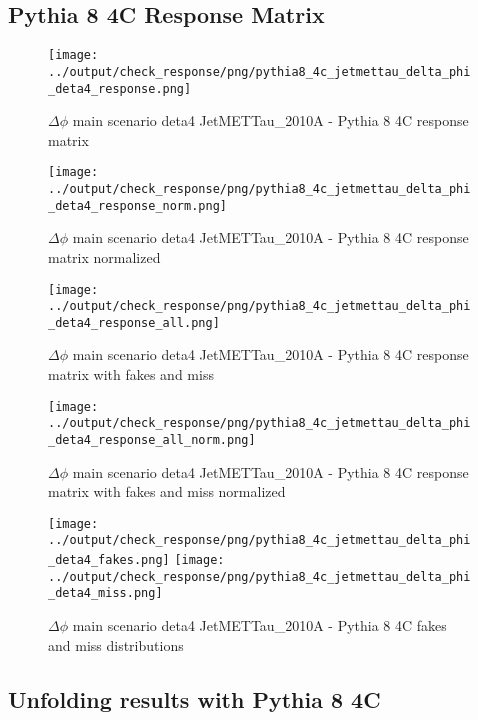\documentclass[11pt]{book}
\begin{document}
\clearpage
\subsection{Pythia 8 4C Response Matrix}


\begin{figure}[ht]
\centering
\texttt{[image: ../output/check\_response/png/pythia8\_4c\_jetmettau\_delta\_phi\_deta4\_response.png]}
\caption{$\Delta\phi$ main scenario deta4 JetMETTau\_2010A - Pythia 8 4C response matrix}
\label{p8_jetmettau_delta_phi_deta4_response}
\end{figure}

\begin{figure}[ht]
\centering
\texttt{[image: ../output/check\_response/png/pythia8\_4c\_jetmettau\_delta\_phi\_deta4\_response\_norm.png]}
\caption{$\Delta\phi$ main scenario deta4 JetMETTau\_2010A - Pythia 8 4C response matrix normalized}
\label{p8_jetmettau_delta_phi_deta4_response_norm}
\end{figure}

\begin{figure}[ht]
\centering
\texttt{[image: ../output/check\_response/png/pythia8\_4c\_jetmettau\_delta\_phi\_deta4\_response\_all.png]}
\caption{$\Delta\phi$ main scenario deta4 JetMETTau\_2010A - Pythia 8 4C response matrix with fakes and miss}
\label{p8_jetmettau_delta_phi_deta4_response_all}
\end{figure}

\begin{figure}[ht]
\centering
\texttt{[image: ../output/check\_response/png/pythia8\_4c\_jetmettau\_delta\_phi\_deta4\_response\_all\_norm.png]}
\caption{$\Delta\phi$ main scenario deta4 JetMETTau\_2010A - Pythia 8 4C response matrix with fakes and miss normalized}
\label{p8_jetmettau_delta_phi_deta4_response_all_norm}
\end{figure}

\begin{figure}[ht]
\centering
\texttt{[image: ../output/check\_response/png/pythia8\_4c\_jetmettau\_delta\_phi\_deta4\_fakes.png]}
\texttt{[image: ../output/check\_response/png/pythia8\_4c\_jetmettau\_delta\_phi\_deta4\_miss.png]}
\caption{$\Delta\phi$ main scenario deta4 JetMETTau\_2010A - Pythia 8 4C fakes and miss distributions}
\label{p8_jetmettau_delta_phi_deta4_fakesmiss}
\end{figure}


\clearpage
\subsection{Unfolding results with Pythia 8 4C}
\end{document}
